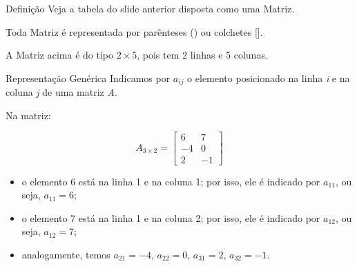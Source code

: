 \documentclass[aspectratio=169,xcolor=dvipsnames]{beamer}
\begin{document}
\begin{frame}{Definição}
  Veja a tabela do slide anterior disposta como uma Matriz.
  \begin{center}
  \end{center}
  Toda Matriz é representada por parênteses () ou colchetes [].

  A Matriz acima é do tipo $2 \times 5$, pois tem 2 linhas e 5 colunas.

\end{frame}


\begin{frame}{Representação Genérica}  
  Indicamos por \textbf{$a_{ij}$} o elemento posicionado na linha \textit{i} e na coluna \textit{j} de uma matriz \textit{A}.

  Na matriz:

  \begin{equation*}
    A_{3 \times 2} = \begin{bmatrix}
      6 & 7 \\
      -4 & 0 \\
      2 & -1
    \end{bmatrix}
  \end{equation*}

  \begin{itemize}
    \item o elemento 6 está na linha 1 e na coluna 1; por isso, ele é indicado por $a_{11}$, ou seja, $a_{11} = 6$;
    \item o elemento 7 está na linha 1 e na coluna 2; por isso, ele é indicado por $a_{12}$, ou seja, $a_{12} = 7$;
    \item analogamente, temos $a_{21} = -4$, $a_{22} = 0$, $a_{31} = 2$, $a_{32} = -1$.
  \end{itemize}
\end{frame}
\end{document}
